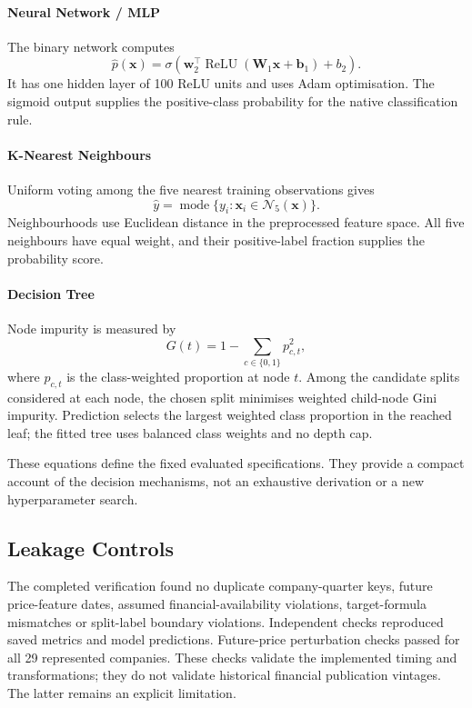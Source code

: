 \documentclass[letterpaper,10pt,conference]{ieeeconf}
\begin{document}
\paragraph{Neural Network / MLP}
The binary network computes
\begin{equation}
\hat{p}(\mathbf{x})=\sigma\!\left(\mathbf{w}_2^{\top}
\operatorname{ReLU}(\mathbf{W}_1\mathbf{x}+\mathbf{b}_1)+b_2\right).
\end{equation}
It has one hidden layer of 100 ReLU units and uses Adam optimisation. The sigmoid output supplies the positive-class probability for the native classification rule.

\paragraph{K-Nearest Neighbours}
Uniform voting among the five nearest training observations gives
\begin{equation}
\hat{y}=\operatorname{mode}\{y_i:\mathbf{x}_i\in\mathcal{N}_5(\mathbf{x})\}.
\end{equation}
Neighbourhoods use Euclidean distance in the preprocessed feature space. All five neighbours have equal weight, and their positive-label fraction supplies the probability score.

\paragraph{Decision Tree}
Node impurity is measured by
\begin{equation}
G(t)=1-\sum_{c\in\{0,1\}}p_{c,t}^{2},
\end{equation}
where $p_{c,t}$ is the class-weighted proportion at node $t$. Among the candidate splits considered at each node, the chosen split minimises weighted child-node Gini impurity. Prediction selects the largest weighted class proportion in the reached leaf; the fitted tree uses balanced class weights and no depth cap.

These equations define the fixed evaluated specifications. They provide a compact account of the decision mechanisms, not an exhaustive derivation or a new hyperparameter search.

\subsection{Leakage Controls}
The completed verification found no duplicate company-quarter keys, future price-feature dates, assumed financial-availability violations, target-formula mismatches or split-label boundary violations. Independent checks reproduced saved metrics and model predictions. Future-price perturbation checks passed for all 29 represented companies. These checks validate the implemented timing and transformations; they do not validate historical financial publication vintages. The latter remains an explicit limitation.
\end{document}
